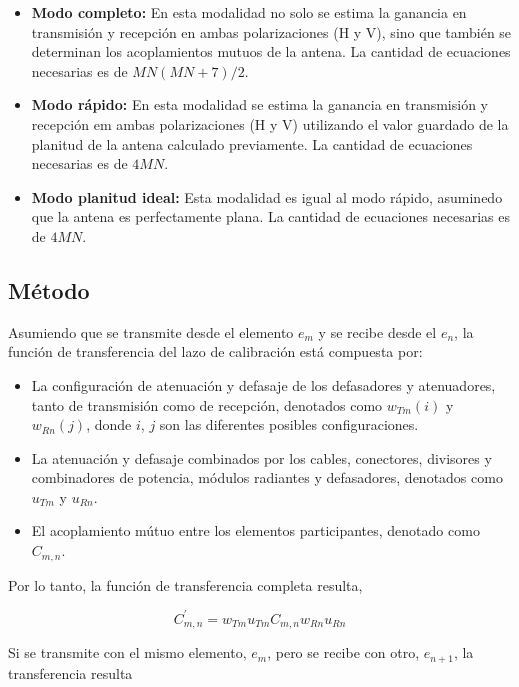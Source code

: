 \begin{itemize}
	\item \textbf{Modo completo:} En esta modalidad no solo se estima la ganancia en transmisión y recepción en ambas 
		polarizaciones (H y V), sino que también se determinan los acoplamientos mutuos de la antena. La cantidad de ecuaciones necesarias es 
		de $MN(MN + 7)/2$.
	\item \textbf{Modo rápido:} En esta modalidad se estima la ganancia en transmisión y recepción em ambas polarizaciones
		(H y V) utilizando el valor guardado de la planitud de la antena calculado previamente. La cantidad de ecuaciones necesarias
		es de $4MN$.
	\item \textbf{Modo planitud ideal:} Esta modalidad es igual al modo rápido, asuminedo que la antena es perfectamente plana. 
		La cantidad de ecuaciones necesarias es de $4MN$.
\end{itemize}


\subsection{Método}

Asumiendo que se transmite desde el elemento $e_m$ y se recibe desde el $e_n$, la función de transferencia del lazo de 
calibración está compuesta por:

\begin{itemize}
	\item La configuración de atenuación y defasaje de los defasadores y atenuadores, tanto de transmisión como de recepción, 
		denotados como $w_{Tm}(i)$ y $w_{Rn}(j)$, donde $i$, $j$ son las diferentes posibles configuraciones. 
	\item La atenuación y defasaje combinados por los cables, conectores, divisores y combinadores de potencia, módulos radiantes
		y defasadores, denotados como $u_{Tm}$ y $u_{Rn}$. 
	\item El acoplamiento mútuo entre los elementos participantes, denotado como $C_{m, n}$.
\end{itemize}
		
Por lo tanto, la función de transferencia completa resulta,

\begin{equation}
	C^{'}_{m,n} = w_{Tm} u_{Tm} C_{m,n} w_{Rn} u_{Rn}
	\label{eq:transfer_mn}
\end{equation}

Si se transmite con el mismo elemento, $e_m$, pero se recibe con otro, $e_{n + 1}$, la transferencia resulta

